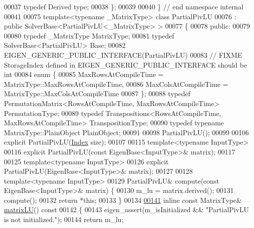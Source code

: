 \begin{DoxyCode}
00037   \textcolor{keyword}{typedef} Derived type;
00038 \};
00039 
00040 \} \textcolor{comment}{// end namespace internal}
00041 
00075 \textcolor{keyword}{template}<\textcolor{keyword}{typename} \_MatrixType> \textcolor{keyword}{class }PartialPivLU
00076   : \textcolor{keyword}{public} SolverBase<PartialPivLU<\_MatrixType> >
00077 \{
00078   \textcolor{keyword}{public}:
00079 
00080     \textcolor{keyword}{typedef} \_MatrixType MatrixType;
00081     \textcolor{keyword}{typedef} SolverBase<PartialPivLU> Base;
00082     EIGEN\_GENERIC\_PUBLIC\_INTERFACE(PartialPivLU)
00083     \textcolor{comment}{// FIXME StorageIndex defined in EIGEN\_GENERIC\_PUBLIC\_INTERFACE should be int}
00084     \textcolor{keyword}{enum} \{
00085       MaxRowsAtCompileTime = MatrixType::MaxRowsAtCompileTime,
00086       MaxColsAtCompileTime = MatrixType::MaxColsAtCompileTime
00087     \};
00088     \textcolor{keyword}{typedef} PermutationMatrix<RowsAtCompileTime, MaxRowsAtCompileTime> PermutationType;
00089     \textcolor{keyword}{typedef} Transpositions<RowsAtCompileTime, MaxRowsAtCompileTime> TranspositionType;
00090     \textcolor{keyword}{typedef} \textcolor{keyword}{typename} MatrixType::PlainObject PlainObject;
00091 
00098     PartialPivLU();
00099 
00106     \textcolor{keyword}{explicit} PartialPivLU(\hyperlink{namespace_eigen_a62e77e0933482dafde8fe197d9a2cfde}{Index} size);
00107 
00115     \textcolor{keyword}{template}<\textcolor{keyword}{typename} InputType>
00116     \textcolor{keyword}{explicit} PartialPivLU(\textcolor{keyword}{const} EigenBase<InputType>& matrix);
00117 
00125     \textcolor{keyword}{template}<\textcolor{keyword}{typename} InputType>
00126     \textcolor{keyword}{explicit} PartialPivLU(EigenBase<InputType>& matrix);
00127 
00128     \textcolor{keyword}{template}<\textcolor{keyword}{typename} InputType>
00129     PartialPivLU& compute(\textcolor{keyword}{const} EigenBase<InputType>& matrix) \{
00130       m\_lu = matrix.derived();
00131       compute();
00132       \textcolor{keywordflow}{return} *\textcolor{keyword}{this};
00133     \}
00134 
\hyperlink{group___l_u___module_abea0d7e51c5591a6db152eade0892d9c}{00141}     \textcolor{keyword}{inline} \textcolor{keyword}{const} MatrixType& \hyperlink{group___l_u___module_abea0d7e51c5591a6db152eade0892d9c}{matrixLU}()\textcolor{keyword}{ const}
00142 \textcolor{keyword}{    }\{
00143       eigen\_assert(m\_isInitialized && \textcolor{stringliteral}{"PartialPivLU is not initialized."});
00144       \textcolor{keywordflow}{return} m\_lu;

\end{DoxyCode}
